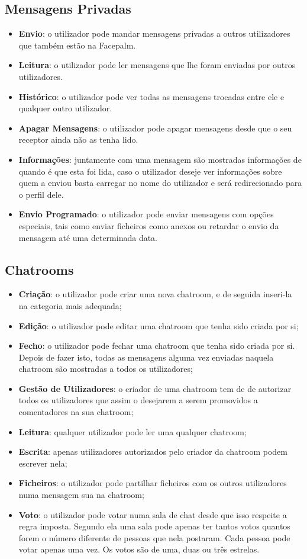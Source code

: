 \documentclass[a4paper, 12pt]{article}
\begin{document}
\subsection{Mensagens Privadas}
\begin{itemize}
	\item \textbf{Envio}: o utilizador pode mandar mensagens privadas a outros utilizadores que também estão na Facepalm.
	\item \textbf{Leitura}: o utilizador pode ler mensagens que lhe foram enviadas por outros utilizadores.
	\item \textbf{Histórico}: o utilizador pode ver todas as mensagens trocadas entre ele e qualquer outro utilizador.
	\item \textbf{Apagar Mensagens}: o utilizador pode apagar mensagens desde que o seu receptor ainda não as tenha lido.
	\item \textbf{Informações}: juntamente com uma mensagem são mostradas informações de quando é que esta foi lida, caso o utilizador deseje ver informações sobre quem a enviou basta carregar no nome do utilizador e será redirecionado para o perfil dele.
	\item \textbf{Envio Programado}: o utilizador pode enviar mensagens com opções especiais, tais como enviar ficheiros como anexos ou retardar o envio da mensagem até uma determinada data.
\end{itemize}

\subsection{Chatrooms}
\begin{itemize}
	\item \textbf{Criação}: o utilizador pode criar uma nova chatroom, e de seguida inseri-la na categoria mais adequada;
	\item \textbf{Edição}: o utilizador pode editar uma chatroom que tenha sido criada por si;
	\item \textbf{Fecho}: o utilizador pode fechar uma chatroom que tenha sido criada por si. Depois de fazer isto, todas as mensagens alguma vez enviadas naquela chatroom são mostradas a todos os utilizadores;
	\item \textbf{Gestão de Utilizadores}: o criador de uma chatroom tem de de autorizar todos os utilizadores que assim o desejarem a serem promovidos a comentadores na sua chatroom;
	\item \textbf{Leitura}: qualquer utilizador pode ler uma qualquer chatroom;
	\item \textbf{Escrita}: apenas utilizadores autorizados pelo criador da chatroom podem escrever nela;
	\item \textbf{Ficheiros}: o utilizador pode partilhar ficheiros com os outros utilizadores numa mensagem sua na chatroom;
	\item \textbf{Voto}: o utilizador pode votar numa sala de chat desde que isso respeite a regra imposta. Segundo ela uma sala pode apenas ter tantos votos quantos forem o número diferente de pessoas que nela postaram. Cada pessoa pode votar apenas uma vez. Os votos são de uma, duas ou três estrelas.
\end{itemize}
\end{document}
